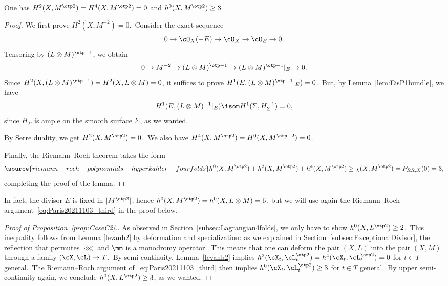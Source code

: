 \begin{lemm}\label{levanh2}
One has $H^2(X, M^{\otp 2})=H^4(X, M^{\otp 2})=0$ and $h^0(X, M^{\otp 2})\ge3$.
\end{lemm}

\begin{proof}
We first prove $H^2(X, M^{-2})=0$.\
Consider the exact sequence
\begin{equation*}
0\to \cO_X(-E)\to \cO_X\to \cO_E\to 0.
\end{equation*}
Tensoring by $(L\otimes M)^{\otp -1}$, we obtain
\begin{equation*}
0\to  M^{-2}\to (L\otimes M)^{\otp -1}\to (L\otimes M)^{\otp -1}\vert_E\to 0.
\end{equation*}
Since $H^2(X,(L\otimes M)^{\otp -1})=H^2(X,L\otimes M)=0$, it  suffices to prove  $H^1(E,(L\otimes M)^{\otp -1}\vert_E)=0$.\
But, by Lemma~\ref{lem:EisP1bundle}, we have
\[
H^1(E,(L\otimes M)^{-1}\vert_E)\isom H^1(\Sigma, H_{\Sigma}^{-1})=0,
\]
since $H_{\Sigma}$ is ample on the smooth surface $\Sigma$, as we wanted.

By Serre duality, we get $H^2(X,M^{\otp 2})=0$.\
We also have $H^4(X,M^{\otp 2})=H^0(X,M^{\otp -2})=0$.

Finally, the Riemann--Roch theorem takes the form
\begin{equation}\label{eq:Paris20211103_third}
\source{riemann-roch-polynomials-hyperkahler-fourfolds}
h^0(X,M^{\otp  2})+h^2(X,M^{\otp  2})+h^4(X,M^{\otp2})\geq \chi(X,M^{\otp  2})=P_{RR,X}(0)=3,
\end{equation}
completing the proof of the lemma.
\end{proof}

In fact, the divisor $E$ is fixed in $|M^{\otp 2}|$, hence $h^0(X,M^{\otp  2})= h^0(X,L\otimes M)=6$, but we will use again the Riemann--Roch argument~\eqref{eq:Paris20211103_third} in the proof below.

\begin{proof}[Proof of Proposition~\ref{prop:CaseC2}.]
As observed in Section~\ref{subsec:Lagrangian4folds}, we only have to show  $h^0(X,L^{\otp 2})\geq 2$.\
This inequality follows from Lemma \ref{levanh2} by deformation and specialization: as we explained in Section~\ref{subsec:ExceptionalDivisor}, the reflection that permutes $\lll$ and $\mm$ is a monodromy operator.\
This means that one can deform the pair $(X,L)$ into the pair $(X,M)$ through a family $(\cX,\cL)\to T$.\
By semi-continuity, Lemma~\ref{levanh2} implies $h^2(\cX_t, \cL_t^{\otp 2})=h^4(\cX_t, \cL_t^{\otp 2})=0$ for $t\in T$ general.\
The Riemann--Roch argument of~\eqref{eq:Paris20211103_third} then implies $h^0(\cX_t, \cL_t^{\otp 2})\geq 3$ for $t\in T$ general.\
By upper semi-continuity again, we conclude $h^0(X,L^{\otp 2})\geq 3$, as we wanted.
\end{proof}


